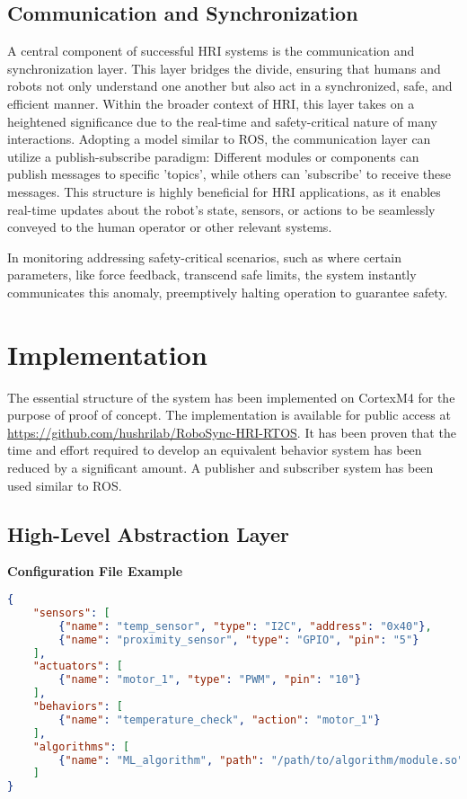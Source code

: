 \documentclass[runningheads]{llncs}
\begin{document}
\subsection{Communication and Synchronization}

A central component of successful HRI systems is the communication and synchronization layer. This layer bridges the divide, ensuring that humans and robots not only understand one another but also act in a synchronized, safe, and efficient manner. Within the broader context of HRI, this layer takes on a heightened significance due to the real-time and safety-critical nature of many interactions. 
Adopting a model similar to ROS, the communication layer can utilize a publish-subscribe paradigm: Different modules or components can publish messages to specific 'topics', while others can 'subscribe' to receive these messages.\cite{Quigley2009} This structure is highly beneficial for HRI applications, as it enables real-time updates about the robot's state, sensors, or actions to be seamlessly conveyed to the human operator or other relevant systems.

In monitoring addressing safety-critical scenarios, such as where certain parameters, like force feedback, transcend safe limits, the system instantly communicates this anomaly, preemptively halting operation to guarantee safety.

\section{Implementation}

The essential structure of the system has been implemented on CortexM4 for the purpose of proof of concept. The implementation is available for public access at \href{https://github.com/hushrilab/RoboSync-HRI-RTOS}{https://github.com/hushrilab/RoboSync-HRI-RTOS}. It has been proven that the time and effort required to develop an equivalent behavior system has been reduced by a significant amount. A publisher and subscriber system has been used similar to ROS. \cite{Quigley2009}

\subsection{High-Level Abstraction Layer}

\lstset{style=config}

\textbf{Configuration File Example}

\begin{lstlisting}[language=json, caption=JSON configuration]
{
    "sensors": [
        {"name": "temp_sensor", "type": "I2C", "address": "0x40"},
        {"name": "proximity_sensor", "type": "GPIO", "pin": "5"}
    ],
    "actuators": [
        {"name": "motor_1", "type": "PWM", "pin": "10"}
    ],
    "behaviors": [
        {"name": "temperature_check", "action": "motor_1"}
    ],
    "algorithms": [
        {"name": "ML_algorithm", "path": "/path/to/algorithm/module.so"}
    ]
}
\end{lstlisting}
\end{document}
